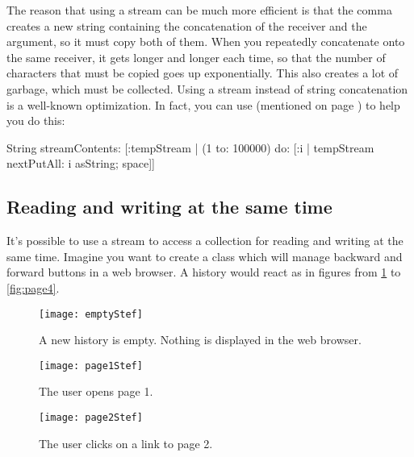 \documentclass[a4paper,10pt,twoside]{book}
\begin{document}
The reason that using a stream can be much more efficient is that the comma creates a new string containing the concatenation of the receiver and the argument, so it must copy both of them.
When you repeatedly concatenate onto the same receiver, it gets longer and longer each time, so that the number of characters that must be copied goes up exponentially.
This also creates a lot of garbage, which must be collected.
Using a stream instead of string concatenation is a well-known optimization.
In fact, you can use  (mentioned on page \pageref{sec:streamContents}) to help you do this:

\begin{code}{}
String streamContents: [:tempStream |
  (1 to: 100000) do: [:i | 
    tempStream nextPutAll: i asString; space]] 
\end{code}

\subsection{Reading and writing at the same time}

It's possible to use a stream to access a collection for reading and writing at the same time.
Imagine you want to create a  class which will manage backward and forward buttons in a web browser.
A history would react as in figures from \ref{fig:emptyStream} to \ref{fig:page4}.

\begin{figure}[!ht]
\centerline{\texttt{[image: emptyStef]}}
\caption{A new history is empty. Nothing is displayed in the web browser.}
\label{fig:emptyStream}
\vspace{.2in}
\end{figure}

\begin{figure}[!ht]
\centerline{\texttt{[image: page1Stef]}}
\caption{The user opens page 1.}
\label{fig:page1}
\vspace{.2in}
\end{figure}

\begin{figure}[!ht]
\centerline{\texttt{[image: page2Stef]}}
\caption{The user clicks on a link to page 2.}
\label{fig:page2}
\vspace{.2in}
\end{figure}
\end{document}
